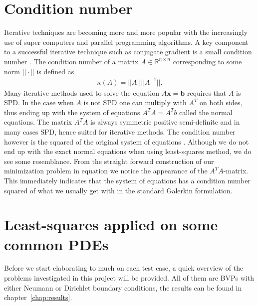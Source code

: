 \section{Condition number} \label{condNum}
Iterative techniques are becoming more and more popular with the increasingly use of super computers and parallel programming algorithms. A key component to a successful iterative technique such as conjugate gradient is a small condition number \cite{Saad}. The condition number of a matrix $A \in \mathbb{R}^{n\times n}$ corresponding to some norm $||\cdot||$ is defined as 
\begin{align}
	\kappa(A) = ||A||||A^{-1}||.
\end{align}
Many iterative methods used to solve the equation $A\mathbf{x}=\mathbf{b}$ requires that $A$ is SPD. In the case when $A$ is not SPD one can multiply with $A^T$ on both sides, thus ending up with the system of equations $A^TA = A^Tb$ called the normal equations. The matrix $A^TA$ is always symmetric positive semi-definite and in many cases SPD, hence suited for iterative methods. The condition number however is the squared of the original system of equations \cite{DM}. Although we do not end up with the exact normal equations when using least-squares method, we do see some resemblance. From the straight forward construction of our minimization problem in equation we notice the appearance of the $A^TA$-matrix. This immediately indicates that the system of equations has a condition number squared of what we usually get with in the standard Galerkin formulation. 
%
%
\section{Least-squares applied on some common PDEs}
Before we start elaborating to much on each test case, a quick overview of the problems investigated in this project will be provided. All of them are BVPs with either Neumann or Dirichlet boundary conditions, the results can be found in chapter~\ref{chap:results}. 

